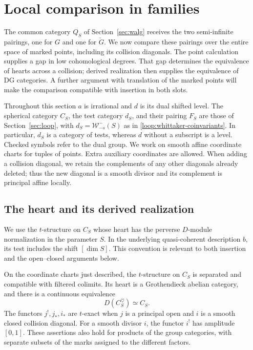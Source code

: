 \section{Local comparison in families}\label{sec:local}

The common category $Q_S$ of Section~\ref{sec:walg} receives the two
semi-infinite pairings, one for $G$ and one for $\check G$.  We now compare
these pairings over the entire space of marked points, including its
collision diagonals.  The point calculation supplies a gap in low
cohomological degrees.  That gap determines the equivalence of hearts
across a collision; derived realization then supplies the equivalence of
DG categories.  A further argument with translation of the marked points
will make the comparison compatible with insertion in both slots.

Throughout this section $a$ is irrational and $d$ is its dual shifted
level.  The spherical category $C_S$, the test category $d_S$, and their
pairing $F_S$ are those of Section~\ref{sec:loop}, with
$d_S=\mathcal W_{-s}^-(S)$ as in
\eqref{loop:whittaker-coinvariants}.  In particular, $d_S$ is a category of tests,
whereas $d$ without a subscript is a level.  Checked symbols refer to the
dual group.  We work on smooth affine coordinate charts for tuples of
points.  Extra auxiliary coordinates are allowed.  When adding a
collision diagonal, we retain the complements of any other diagonals
already deleted; thus the new diagonal is a smooth divisor and its
complement is principal affine locally.

\subsection{The heart and its derived realization}

We use the $t$-structure on $C_S$ whose heart has the perverse
$D$-module normalization in the parameter $S$.  In the underlying
quasi-coherent description $b$, its test includes the shift $[\dim S]$.
This convention is relevant to both insertion and the open--closed
arguments below.

\begin{proposition}\label{local:heart}
On the coordinate charts just described, the $t$-structure on $C_S$ is
separated and compatible with filtered colimits.  Its heart is a
Grothendieck abelian category, and there is a continuous equivalence
\begin{equation}\label{eq:L8}
                     D(C_S^\heartsuit)\simeq C_S.
\end{equation}
The functors $j^!,j_*,i_*$ are $t$-exact when $j$ is a principal open and
$i$ is a smooth closed collision diagonal.  For a smooth divisor
$i$, the functor $i^!$ has amplitude $[0,1]$.  These assertions also hold
for products of the group categories, with separate subsets of the
marks assigned to the different factors.
\end{proposition}


